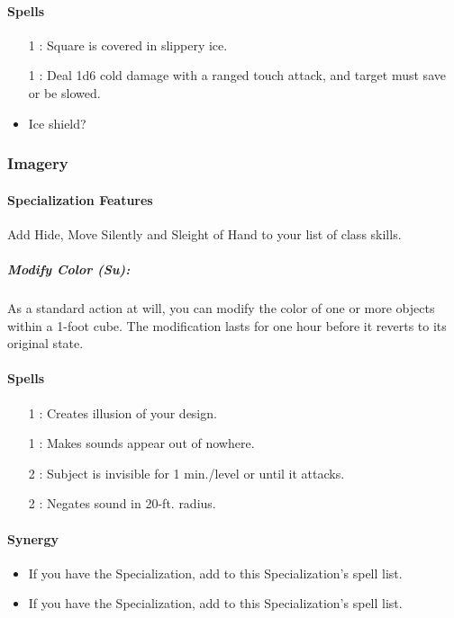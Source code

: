 \paragraph{Spells}
\begin{itemize}
 \item[1] : Square is covered in slippery ice.
 \item[1] : Deal 1d6 cold damage with a ranged touch attack, and target must save or be slowed.
 \item Ice shield?
\end{itemize}

\subsubsection{Imagery}
\paragraph{Specialization Features}
Add Hide, Move Silently and Sleight of Hand to your list of class skills.
\subparagraph{Modify Color (Su):} As a standard action at will, you can modify the color of one or more objects within a 1-foot cube. The modification lasts for one hour before it reverts to its original state.
\paragraph{Spells}
\begin{itemize}
 \item[1] : Creates illusion of your design.
 \item[1] : Makes sounds appear out of nowhere.
 \item[2] : Subject is invisible for 1 min./level or until it attacks.
 \item[2] : Negates sound in 20-ft. radius.
\end{itemize}
\paragraph{Synergy} 
\begin{itemize}
 \item If you have the  Specialization, add  to this Specialization's spell list.
 \item If you have the  Specialization, add  to this Specialization's spell list.
\end{itemize}

